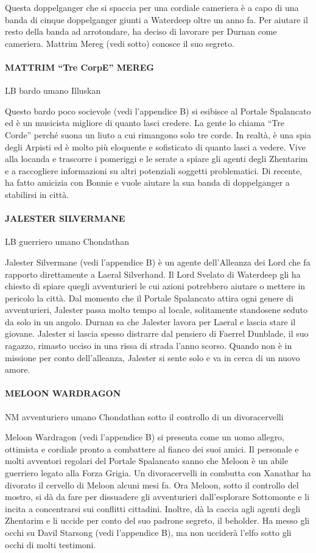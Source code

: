 \documentclass{article}
\begin{document}
Questa doppelganger che si spaccia per una cordiale cameriera è a capo di una banda di cinque doppelganger giunti a Waterdeep oltre un anno fa. Per aiutare il resto della banda ad arrotondare, ha deciso di lavorare per Durnan come cameriera. Mattrim Mereg (vedi sotto) conosce il suo segreto.

\paragraph{MATTRIM “Tre CorpE” MEREG}
LB bardo umano Illuskan

Questo bardo poco socievole (vedi l'appendice B) si esibisce al Portale Spalancato ed è un musicista migliore di quanto lasci credere. La gente lo chiama “Tre Corde” perché suona un liuto a cui rimangono solo tre corde. In realtà, è una spia degli Arpisti ed è molto più eloquente e sofisticato di quanto lasci a vedere. Vive alla locanda e trascorre i pomeriggi e le serate a spiare gli agenti degli Zhentarim e a raccogliere informazioni su altri potenziali soggetti problematici. Di recente, ha fatto amicizia con Bonnie e vuole aiutare la sua banda di doppelganger a stabilirsi in città.

\paragraph{JALESTER SILVERMANE}
LB guerriero umano Chondathan

Jalester Silvermane (vedi l'appendice B) è un agente dell'Alleanza dei Lord che fa rapporto direttamente a Laeral Silverhand. Il Lord Svelato di Waterdeep gli ha chiesto di spiare quegli avventurieri le cui azioni potrebbero aiutare o mettere in pericolo la città. Dal momento che il Portale Spalancato attira ogni genere di avventurieri, Jalester passa molto tempo al locale, solitamente standosene seduto da solo in un angolo. Durnan sa che Jalester lavora per Laeral e lascia stare il giovane. Jalester si lascia spesso distrarre dal pensiero di Faerrel Dunblade, il suo ragazzo, rimasto ucciso in una rissa di strada l’anno scorso. Quando non è in missione per conto dell'alleanza, Jalester si sente solo e va in cerca di un nuovo amore.

\paragraph{MELOON WARDRAGON}
NM avventuriero umano Chondathan sotto il controllo di un divoracervelli

Meloon Wardragon (vedi l'appendice B) si presenta come un uomo allegro, ottimista e cordiale pronto a combattere al fianco dei suoi amici. Il personale e molti avventori regolari del Portale Spalancato sanno che Meloon è un abile guerriero legato alla Forza Grigia. Un divoracervelli in combutta con Xanathar ha divorato il cervello di Meloon alcuni mesi fa. Ora Meloon, sotto il controllo del mostro, si dà da fare per dissuadere gli avventurieri dall'esplorare Sottomonte e li incita a concentrarsi sui conflitti cittadini. Inoltre, dà la caccia agli agenti degli Zhentarim e li uccide per conto del suo padrone segreto, il beholder. Ha messo gli occhi su Davil Starsong (vedi l'appendice B), ma non ucciderà l’elfo sotto gli occhi di molti testimoni.
\end{document}
